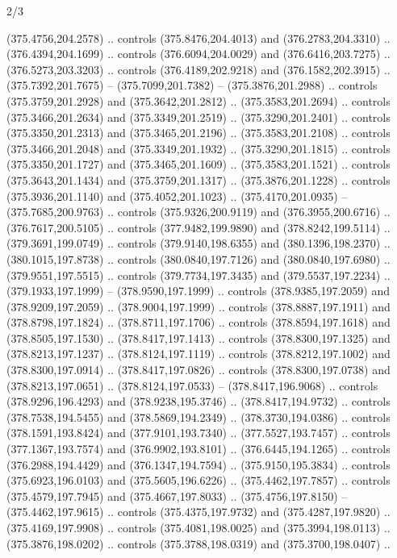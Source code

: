\begin{flagdescription}{2/3}
\begin{scope}[xshift=0.5\flaglength,yshift=0.5\flagwidth,scale=\flagwidth/495.65]
\begin{scope}[y=0.8pt, x=0.8pt, yscale=-1,shift={(-463.76,-309.78)}]
  (375.4756,204.2578) .. controls (375.8476,204.4013) and (376.2783,204.3310) ..
  (376.4394,204.1699) .. controls (376.6094,204.0029) and (376.6416,203.7275) ..
  (376.5273,203.3203) .. controls (376.4189,202.9218) and (376.1582,202.3915) ..
  (375.7392,201.7675) -- (375.7099,201.7382) -- (375.3876,201.2988) .. controls
  (375.3759,201.2928) and (375.3642,201.2812) .. (375.3583,201.2694) .. controls
  (375.3466,201.2634) and (375.3349,201.2519) .. (375.3290,201.2401) .. controls
  (375.3350,201.2313) and (375.3465,201.2196) .. (375.3583,201.2108) .. controls
  (375.3466,201.2048) and (375.3349,201.1932) .. (375.3290,201.1815) .. controls
  (375.3350,201.1727) and (375.3465,201.1609) .. (375.3583,201.1521) .. controls
  (375.3643,201.1434) and (375.3759,201.1317) .. (375.3876,201.1228) .. controls
  (375.3936,201.1140) and (375.4052,201.1023) .. (375.4170,201.0935) --
  (375.7685,200.9763) .. controls (375.9326,200.9119) and (376.3955,200.6716) ..
  (376.7617,200.5105) .. controls (377.9482,199.9890) and (378.8242,199.5114) ..
  (379.3691,199.0749) .. controls (379.9140,198.6355) and (380.1396,198.2370) ..
  (380.1015,197.8738) .. controls (380.0840,197.7126) and (380.0840,197.6980) ..
  (379.9551,197.5515) .. controls (379.7734,197.3435) and (379.5537,197.2234) ..
  (379.1933,197.1999) -- (378.9590,197.1999) .. controls (378.9385,197.2059) and
  (378.9209,197.2059) .. (378.9004,197.1999) .. controls (378.8887,197.1911) and
  (378.8798,197.1824) .. (378.8711,197.1706) .. controls (378.8594,197.1618) and
  (378.8505,197.1530) .. (378.8417,197.1413) .. controls (378.8300,197.1325) and
  (378.8213,197.1237) .. (378.8124,197.1119) .. controls (378.8212,197.1002) and
  (378.8300,197.0914) .. (378.8417,197.0826) .. controls (378.8300,197.0738) and
  (378.8213,197.0651) .. (378.8124,197.0533) -- (378.8417,196.9068) .. controls
  (378.9296,196.4293) and (378.9238,195.3746) .. (378.8417,194.9732) .. controls
  (378.7538,194.5455) and (378.5869,194.2349) .. (378.3730,194.0386) .. controls
  (378.1591,193.8424) and (377.9101,193.7340) .. (377.5527,193.7457) .. controls
  (377.1367,193.7574) and (376.9902,193.8101) .. (376.6445,194.1265) .. controls
  (376.2988,194.4429) and (376.1347,194.7594) .. (375.9150,195.3834) .. controls
  (375.6923,196.0103) and (375.5605,196.6226) .. (375.4462,197.7857) .. controls
  (375.4579,197.7945) and (375.4667,197.8033) .. (375.4756,197.8150) --
  (375.4462,197.9615) .. controls (375.4375,197.9732) and (375.4287,197.9820) ..
  (375.4169,197.9908) .. controls (375.4081,198.0025) and (375.3994,198.0113) ..
  (375.3876,198.0202) .. controls (375.3788,198.0319) and (375.3700,198.0407) ..

\end{scope}
\end{scope}
\end{flagdescription}
